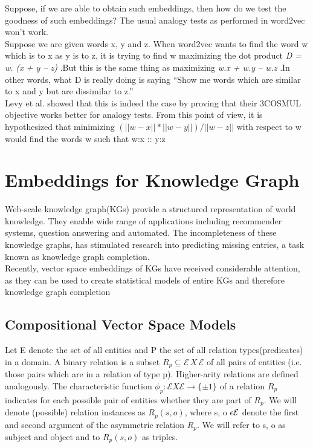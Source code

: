 \documentclass[12pt]{article}
\newcommand{\ET}{\mathcal{E}}
\begin{document}
Suppose, if we are able to obtain such embeddings, then how do we test the goodness of such embeddings? The usual analogy tests as performed in word2vec won't work.\\

Suppose we are given words x, y and z. When word2vec wants to find the word w which is to x as y is to z, it is trying to find w maximizing the dot product \textit{D = w. (x + y – z)} .But this is the same thing as maximizing \textit{w.x + w.y – w.z} .In other words, what D is really doing is saying ``Show me words which are similar to x and y but are dissimilar to z.''\\ 

Levy et al.\cite{Levy14linguisticregularities} showed that this is indeed the case by proving that their 3COSMUL objective works better for analogy tests.
From this point of view, it is hypothesized that minimizing $( ||w-x|| * ||w-y|| ) / ||w-z||$ with respect to w would find the words w such that w:x :: y:z

\section{Embeddings for Knowledge Graph}
Web-scale knowledge graph(KGs) provide a structured representation of world knowledge. They enable wide range of applications including recommender systems, question answering and automated. The incompleteness of these knowledge graphs, has stimulated research into predicting missing entries, a task known as knowledge graph completion. \\

Recently, vector space embeddings of KGs have received considerable attention, as they can be used to create statistical models of entire KGs
and therefore knowledge graph completion

\subsection{Compositional Vector Space Models}
Let E denote the set of all entities and P the set of all relation types(predicates) in a domain. A binary relation is a subset $R_p \subseteq \ET  \, X \, \ET$ of all pairs of entities (i.e. those pairs which are in a relation of type p). Higher-arity relations are defined analogously. The characteristic function $\phi_p :\ET X \ET \rightarrow \{ \pm 1\}$ of a relation $R_p$ indicates for each possible pair of entities whether they are part of $R_p$. We will denote (possible) relation instances as $R_p(s, o)$, where s, o $\epsilon \space \ET$ denote the first and second argument of the asymmetric relation $R_p$. We will refer to s, o as subject and object and to $R_p(s, o)$ as triples.
\end{document}
